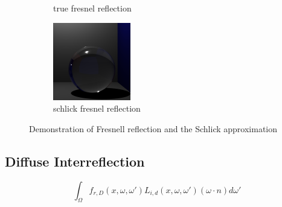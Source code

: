 \begin{figure}[h]
\begin{subfigure}[b]{0.3\textwidth}
	\caption{true fresnel reflection}
\end{subfigure}
\begin{subfigure}[b]{0.3\textwidth}
	\includegraphics[width=\textwidth]{./images/renders/refraction/render-schlick.png}
	\caption{schlick fresnel reflection}
\end{subfigure}
\caption{Demonstration of Fresnell reflection and the Schlick approximation}
\label{fig:shlick-compare}
\end{figure}

\subsection{Diffuse Interreflection}
\begin{equation*}
		\int_{\Omega}
			f_{r,D}(x, \omega, \omega')
			L_{i,d}(x,\omega,\omega')
			(\omega \cdot n)d\omega'
\end{equation*}

